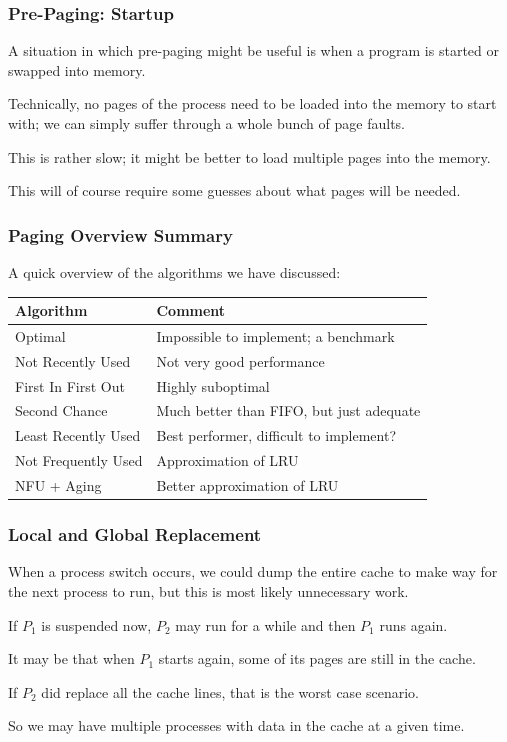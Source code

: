 \begin{frame}
\frametitle{Pre-Paging: Startup}

A situation in which pre-paging might be useful is when a program is started or swapped into memory. 

Technically, no pages of the process need to be loaded into the memory to start with; we can simply suffer through a whole bunch of page faults.

This is rather slow; it might be better to load multiple pages into the memory.

This will of course require some guesses about what pages will be needed.

\end{frame}

\begin{frame}
\frametitle{Paging Overview Summary}

A quick overview of the algorithms we have discussed:

\begin{center}
\begin{tabular}{l|l}
	\textbf{Algorithm} & \textbf{Comment} \\ \hline
	Optimal & Impossible to implement; a benchmark\\
	Not Recently Used &  Not very good performance \\
	First In First Out & Highly suboptimal \\
	Second Chance & Much better than FIFO, but just adequate \\
	Least Recently Used & Best performer, difficult to implement? \\
	Not Frequently Used & Approximation of LRU \\
	NFU + Aging & Better approximation of LRU\\
\end{tabular}
\end{center}


\end{frame}

\begin{frame}
\frametitle{Local and Global Replacement}

When a process switch occurs, we could dump the entire cache to make way for the next process to run, but this is most likely unnecessary work. 

If $P_{1}$ is suspended now, $P_{2}$ may run for a while and then $P_{1}$ runs again.

It may be that when $P_{1}$ starts again, some of its pages are still in the cache.

If $P_{2}$ did replace all the cache lines, that is the worst case scenario. 

So we may have multiple processes with data in the cache at a given time.

\end{frame}


